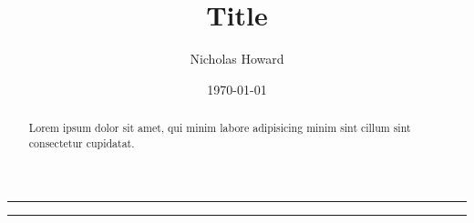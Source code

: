 








\settings
{}

\title{Title}
\author{Nicholas Howard}

\date{\today}
\maketitle

\thispagestyle{titlepage}

\vspace{4mm}
\hrule
\vspace{4mm}

\begin{abstract}
\normalsize
Lorem ipsum dolor sit amet, qui minim labore adipisicing minim sint cillum sint
consectetur cupidatat.
\end{abstract}

\vspace{4mm}
\hrule
\vspace{4mm}

\tableofcontents
\settings
\newpage


\newpage


\printbibliography



